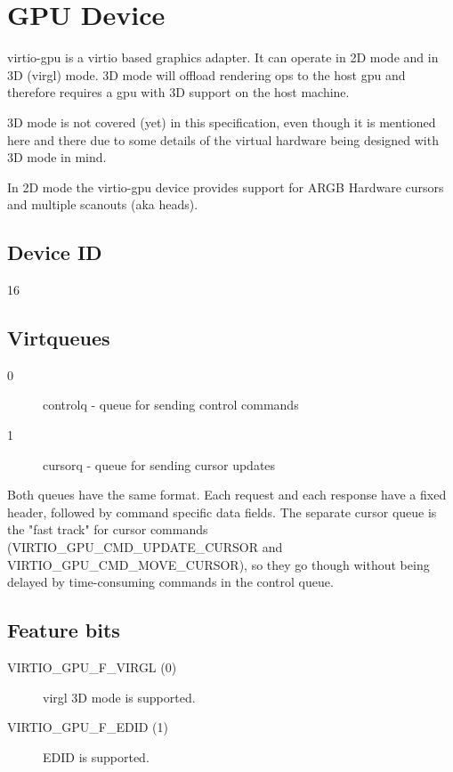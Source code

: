 \section{GPU Device}\label{sec:Device Types / GPU Device}

virtio-gpu is a virtio based graphics adapter.  It can operate in 2D
mode and in 3D (virgl) mode.  3D mode will offload rendering ops to
the host gpu and therefore requires a gpu with 3D support on the host
machine.

3D mode is not covered (yet) in this specification, even though it is
mentioned here and there due to some details of the virtual hardware
being designed with 3D mode in mind.

In 2D mode the virtio-gpu device provides support for ARGB Hardware
cursors and multiple scanouts (aka heads).

\subsection{Device ID}\label{sec:Device Types / GPU Device / Device ID}

16

\subsection{Virtqueues}\label{sec:Device Types / GPU Device / Virtqueues}

\begin{description}
\item[0] controlq - queue for sending control commands
\item[1] cursorq - queue for sending cursor updates
\end{description}

Both queues have the same format.  Each request and each response have
a fixed header, followed by command specific data fields.  The
separate cursor queue is the "fast track" for cursor commands
(VIRTIO_GPU_CMD_UPDATE_CURSOR and VIRTIO_GPU_CMD_MOVE_CURSOR), so they
go though without being delayed by time-consuming commands in the
control queue.

\subsection{Feature bits}\label{sec:Device Types / GPU Device / Feature bits}

\begin{description}
\item[VIRTIO_GPU_F_VIRGL (0)] virgl 3D mode is supported.
\item[VIRTIO_GPU_F_EDID  (1)] EDID is supported.
\end{description}

